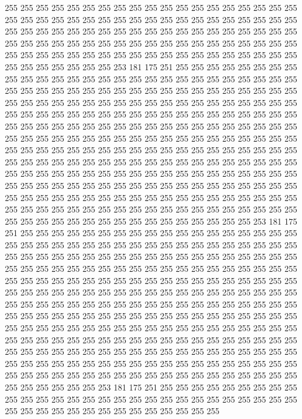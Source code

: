 255 255 255 255 255 255 255 255 255 255 255 255 255 255 255 255 255 255 255 255
255 255 255 255 255 255 255 255 255 255 255 255 255 255 255 255 255 255 255 255
255 255 255 255 255 255 255 255 255 255 255 255 255 255 255 255 255 255 255 255
255 255 255 255 255 255 255 255 255 255 255 255 255 255 255 255 255 255 255 255
255 255 255 255 255 255 255 255 255 255 255 255 255 255 255 255 255 255 255 255
255 255 253 181 175 251 255 255 255 255 255 255 255 255 255 255 255 255 255 255
255 255 255 255 255 255 255 255 255 255 255 255 255 255 255 255 255 255 255 255
255 255 255 255 255 255 255 255 255 255 255 255 255 255 255 255 255 255 255 255
255 255 255 255 255 255 255 255 255 255 255 255 255 255 255 255 255 255 255 255
255 255 255 255 255 255 255 255 255 255 255 255 255 255 255 255 255 255 255 255
255 255 255 255 255 255 255 255 255 255 255 255 255 255 255 255 255 255 255 255
255 255 255 255 255 255 255 255 255 255 255 255 255 255 255 255 255 255 255 255
255 255 255 255 255 255 255 255 255 255 255 255 255 255 255 255 255 255 255 255
255 255 255 255 255 255 255 255 255 255 255 255 255 255 255 255 255 255 255 255
255 255 255 255 255 255 255 255 255 255 255 255 255 255 255 255 255 255 255 255
255 255 255 255 255 255 255 255 255 255 255 255 255 255 255 255 255 255 255 255
255 255 255 255 255 255 255 255 255 255 255 255 255 255 255 255 255 255 255 255
255 255 255 255 255 255 255 255 255 255 255 255 255 255 255 255 255 255 253 181
175 251 255 255 255 255 255 255 255 255 255 255 255 255 255 255 255 255 255 255
255 255 255 255 255 255 255 255 255 255 255 255 255 255 255 255 255 255 255 255
255 255 255 255 255 255 255 255 255 255 255 255 255 255 255 255 255 255 255 255
255 255 255 255 255 255 255 255 255 255 255 255 255 255 255 255 255 255 255 255
255 255 255 255 255 255 255 255 255 255 255 255 255 255 255 255 255 255 255 255
255 255 255 255 255 255 255 255 255 255 255 255 255 255 255 255 255 255 255 255
255 255 255 255 255 255 255 255 255 255 255 255 255 255 255 255 255 255 255 255
255 255 255 255 255 255 255 255 255 255 255 255 255 255 255 255 255 255 255 255
255 255 255 255 255 255 255 255 255 255 255 255 255 255 255 255 255 255 255 255
255 255 255 255 255 255 255 255 255 255 255 255 255 255 255 255 255 255 255 255
255 255 255 255 255 255 255 255 255 255 255 255 255 255 255 255 255 255 255 255
255 255 255 255 255 255 255 255 255 255 255 255 255 255 255 255 255 255 255 255
255 255 255 255 255 255 255 255 255 255 255 255 255 255 253 181 175 251 255 255
255 255 255 255 255 255 255 255 255 255 255 255 255 255 255 255 255 255 255 255
255 255 255 255 255 255 255 255 255 255 255 255 255 255 255 255 255 255 255 255
